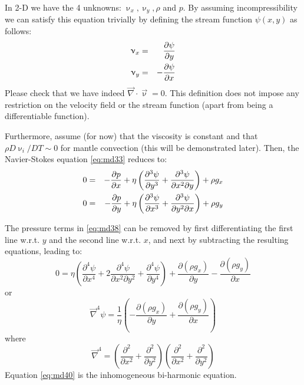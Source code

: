 In 2-D we have the 4 unknowns: $\upnu_x, \upnu_y,\rho$ and $p$. 
By assuming incompressibility we can
satisfy this equation trivially by defining the stream function $\psi(x,y)$ as follows:
\begin{eqnarray}
\upnu_x &=& \frac{\partial \psi}{\partial y} \nonumber\\
\upnu_y &=&-\frac{\partial \psi}{\partial x} \label{eq:md37}
\end{eqnarray}
Please check that we have indeed $\vec\nabla\cdot\vec\upnu=0$.
This definition does not impose any restriction on the velocity
field or the stream function (apart from being a differentiable function).

Furthermore, assume (for now) that the viscosity is constant and that
$\rho D\upnu_i/DT \sim 0$ for mantle
convection (this will be demonstrated later). Then, the Navier-Stokes equation \eqref{eq:md33}
reduces to:
\begin{eqnarray}
0 &=& -\frac{\partial p}{\partial x} + \eta \left( 
\frac{\partial^3 \psi}{\partial y^3}  + \frac{\partial^3 \psi}{\partial x^2 \partial y}  
\right) + \rho g_x \nonumber\\
0 &=& -\frac{\partial p}{\partial y} + \eta \left( 
\frac{\partial^3 \psi}{\partial x^3}  + \frac{\partial^3 \psi}{\partial y^2 \partial x}  
\right) + \rho g_y 
\label{eq:md38}
\end{eqnarray}


\vspace{0.5cm}
\vspace{0.5cm}

The pressure terms in \eqref{eq:md38} can be removed by first differentiating 
the first line w.r.t. $y$ and the second line w.r.t. $x$, 
and next by subtracting the resulting equations, leading to:
\begin{equation}
0 = \eta 
\left(
\frac{\partial^4 \psi}{\partial x^4}
+
2\frac{\partial^4 \psi}{\partial x^2\partial y^2}
+
\frac{\partial^4 \psi}{\partial y^4}
\right)
+\frac{\partial (\rho g_x)}{\partial y}
-\frac{\partial (\rho g_y)}{\partial x}
\label{eq:md39}
\end{equation}
or
\begin{equation}
\vec\nabla^4 \psi = \frac{1}{\eta} \left( -\frac{\partial (\rho g_x)}{\partial y}
+\frac{\partial (\rho g_y)}{\partial x} \right)
\label{eq:md40}
\end{equation}
where
\[
\vec\nabla^4 = 
\left( 
\frac{\partial^2 }{\partial x^2} + \frac{\partial^2 }{\partial y^2} 
\right) 
\left( 
\frac{\partial^2 }{\partial x^2} + \frac{\partial^2 }{\partial y^2} 
\right) 
\]
Equation \eqref{eq:md40} is the inhomogeneous bi-harmonic equation.



